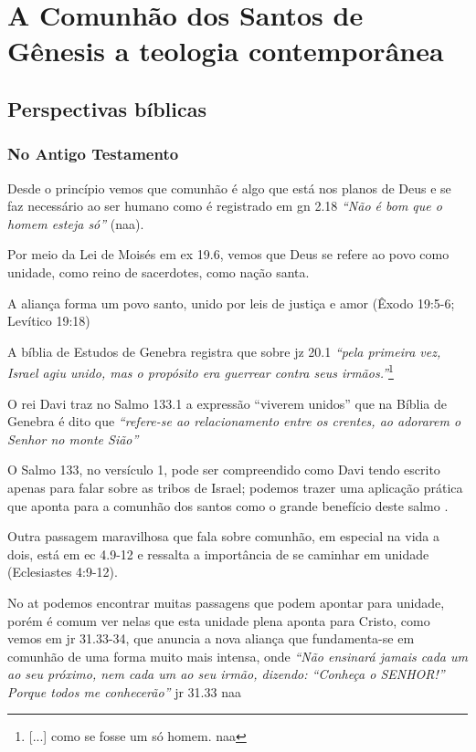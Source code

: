 \chapter{A Comunhão dos Santos de Gênesis a teologia contemporânea}

\section{Perspectivas bíblicas}

\subsection{No Antigo Testamento}

Desde o princípio vemos que comunhão é algo que está nos planos de Deus e se faz necessário ao ser humano como é registrado em \gls{gn} 2.18 \textit{``Não é bom que o homem esteja só''} (\gls{naa}).

Por meio da Lei de Moisés em \gls{ex} 19.6, vemos que Deus se refere ao povo como unidade, como reino de sacerdotes, como nação santa.

A aliança forma um povo santo, unido por leis de justiça e amor (Êxodo 19:5-6; Levítico 19:18)

A bíblia de Estudos de Genebra registra que sobre \gls{jz} 20.1 \textit{``pela primeira vez, Israel agiu unido, mas o propósito era guerrear contra seus irmãos.''}\footnote{[...] como se fosse um só homem. \gls{naa}} \cite[p. 443]{bibliaGenebra}

O rei Davi traz no Salmo 133.1 a expressão ``viverem unidos'' que na Bíblia de Genebra é dito que \textit{``refere-se ao relacionamento entre os crentes, ao adorarem o Senhor no monte Sião''} \cite[p. 1053]{bibliaGenebra}

O Salmo 133, no versículo 1, pode ser compreendido como Davi tendo escrito apenas para falar sobre as tribos de Israel; podemos trazer uma aplicação prática que aponta para a comunhão dos santos como o grande benefício deste salmo \cite[p. 1077]{mathewHenry}.

Outra passagem maravilhosa que fala sobre comunhão, em especial na vida a dois, está em \gls{ec} 4.9-12 e ressalta a importância de se caminhar em unidade (Eclesiastes 4:9-12).

No \gls{at} podemos encontrar muitas passagens que podem apontar para unidade, porém é comum ver nelas que esta unidade plena aponta para Cristo, como vemos em \gls{jr} 31.33-34, que anuncia a nova aliança que fundamenta-se em comunhão de uma forma muito mais intensa, onde \textit{``Não ensinará jamais cada um ao seu próximo, nem cada um ao seu irmão, dizendo: “Conheça o SENHOR!” Porque todos me conhecerão''} \gls{jr} 31.33 \gls{naa}

